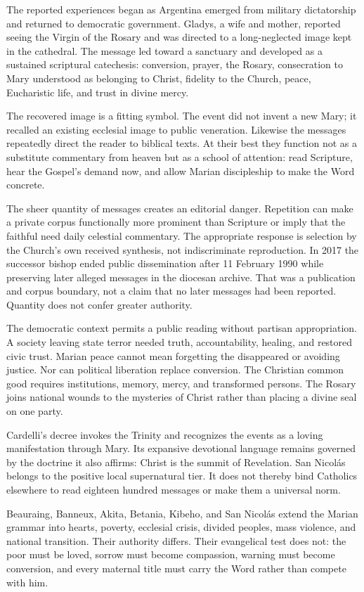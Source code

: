 The reported experiences began as Argentina emerged from military dictatorship and returned to democratic government. Gladys, a wife and mother, reported seeing the Virgin of the Rosary and was directed to a long-neglected image kept in the cathedral. The message led toward a sanctuary and developed as a sustained scriptural catechesis: conversion, prayer, the Rosary, consecration to Mary understood as belonging to Christ, fidelity to the Church, peace, Eucharistic life, and trust in divine mercy.

The recovered image is a fitting symbol. The event did not invent a new Mary; it recalled an existing ecclesial image to public veneration. Likewise the messages repeatedly direct the reader to biblical texts. At their best they function not as a substitute commentary from heaven but as a school of attention: read Scripture, hear the Gospel's demand now, and allow Marian discipleship to make the Word concrete.

The sheer quantity of messages creates an editorial danger. Repetition can make a private corpus functionally more prominent than Scripture or imply that the faithful need daily celestial commentary. The appropriate response is selection by the Church's own received synthesis, not indiscriminate reproduction. In 2017 the successor bishop ended public dissemination after 11 February 1990 while preserving later alleged messages in the diocesan archive. That was a publication and corpus boundary, not a claim that no later messages had been reported. Quantity does not confer greater authority.

The democratic context permits a public reading without partisan appropriation. A society leaving state terror needed truth, accountability, healing, and restored civic trust. Marian peace cannot mean forgetting the disappeared or avoiding justice. Nor can political liberation replace conversion. The Christian common good requires institutions, memory, mercy, and transformed persons. The Rosary joins national wounds to the mysteries of Christ rather than placing a divine seal on one party.

Cardelli's decree invokes the Trinity and recognizes the events as a loving manifestation through Mary. Its expansive devotional language remains governed by the doctrine it also affirms: Christ is the summit of Revelation. San Nicolás belongs to the positive local supernatural tier. It does not thereby bind Catholics elsewhere to read eighteen hundred messages or make them a universal norm.

Beauraing, Banneux, Akita, Betania, Kibeho, and San Nicolás extend the Marian grammar into hearts, poverty, ecclesial crisis, divided peoples, mass violence, and national transition. Their authority differs. Their evangelical test does not: the poor must be loved, sorrow must become compassion, warning must become conversion, and every maternal title must carry the Word rather than compete with him.
